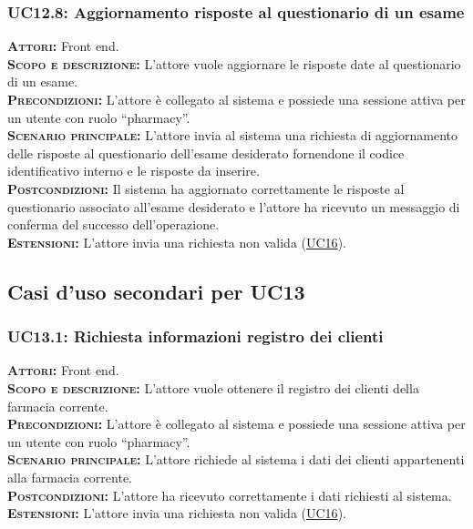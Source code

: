 \subsubsection{UC12.8: Aggiornamento risposte al questionario di un esame}
\label{sec:UC128}
\textsc{\textbf{Attori:}} Front end.\\
\textsc{\textbf{Scopo e descrizione:}} L'attore vuole aggiornare le risposte date al questionario di un esame.\\
\textsc{\textsc{\textbf{Precondizioni:}}} L'attore è collegato al sistema e possiede una sessione attiva per un utente con ruolo ``pharmacy''.\\
\textsc{\textbf{Scenario principale:}} L'attore invia al sistema una richiesta di aggiornamento delle risposte al questionario dell'esame desiderato fornendone il codice identificativo interno e le risposte da inserire.\\
\textsc{\textbf{Postcondizioni:}} Il sistema ha aggiornato correttamente le risposte al questionario associato all'esame desiderato e l'attore ha ricevuto un messaggio di conferma del successo dell'operazione.\\
\textsc{\textbf{Estensioni:}} L'attore invia una richiesta non valida (\hyperref[sec:UC16]{UC16}).

\subsection{Casi d'uso secondari per UC13}
\subsubsection{UC13.1: Richiesta informazioni registro dei clienti}
\label{sec:UC131}
\textsc{\textbf{Attori:}} Front end.\\
\textsc{\textbf{Scopo e descrizione:}} L'attore vuole ottenere il registro dei clienti della farmacia corrente.\\
\textsc{\textsc{\textbf{Precondizioni:}}} L'attore è collegato al sistema e possiede una sessione attiva per un utente con ruolo ``pharmacy''.\\
\textsc{\textbf{Scenario principale:}} L'attore richiede al sistema i dati dei clienti appartenenti alla farmacia corrente.\\
\textsc{\textbf{Postcondizioni:}} L'attore ha ricevuto correttamente i dati richiesti al sistema.\\
\textsc{\textbf{Estensioni:}} L'attore invia una richiesta non valida (\hyperref[sec:UC16]{UC16}).

